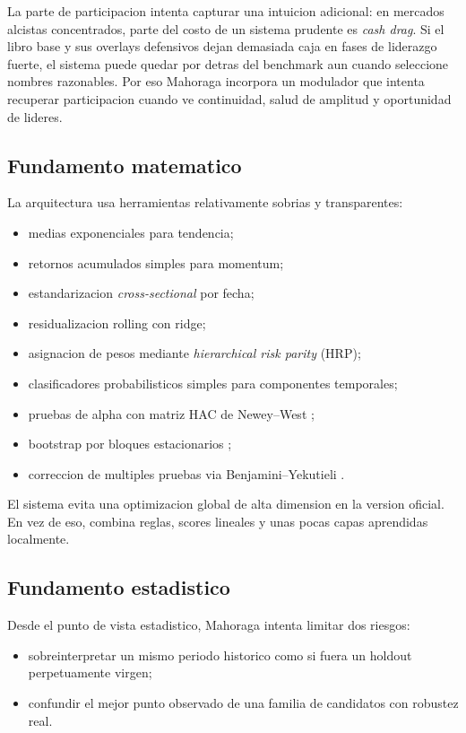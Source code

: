 \documentclass[11pt,letterpaper]{article}
\begin{document}
La parte de participacion intenta capturar una intuicion adicional: en mercados alcistas concentrados, parte del costo de un sistema prudente es \emph{cash drag}. Si el libro base y sus overlays defensivos dejan demasiada caja en fases de liderazgo fuerte, el sistema puede quedar por detras del benchmark aun cuando seleccione nombres razonables. Por eso Mahoraga incorpora un modulador que intenta recuperar participacion cuando ve continuidad, salud de amplitud y oportunidad de lideres.

\subsection{Fundamento matematico}
La arquitectura usa herramientas relativamente sobrias y transparentes:

\begin{itemize}
    \item medias exponenciales para tendencia;
    \item retornos acumulados simples para momentum;
    \item estandarizacion \emph{cross-sectional} por fecha;
    \item residualizacion rolling con ridge;
    \item asignacion de pesos mediante \emph{hierarchical risk parity} (HRP);
    \item clasificadores probabilisticos simples para componentes temporales;
    \item pruebas de alpha con matriz HAC de Newey--West \citep{neweyWest1987};
    \item bootstrap por bloques estacionarios \citep{politisRomano1994};
    \item correccion de multiples pruebas via Benjamini--Yekutieli \citep{benjaminiYekutieli2001}.
\end{itemize}

El sistema evita una optimizacion global de alta dimension en la version oficial. En vez de eso, combina reglas, scores lineales y unas pocas capas aprendidas localmente.

\subsection{Fundamento estadistico}
Desde el punto de vista estadistico, Mahoraga intenta limitar dos riesgos:

\begin{itemize}
    \item sobreinterpretar un mismo periodo historico como si fuera un holdout perpetuamente virgen;
    \item confundir el mejor punto observado de una familia de candidatos con robustez real.
\end{itemize}
\end{document}
